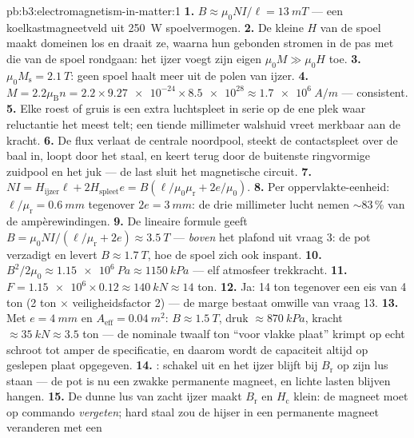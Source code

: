 \begin{solution}{pb:b3:electromagnetism-in-matter:1}
\textbf{1.} $B \approx \mu_0NI/\ell = \qty{13}{mT}$ --- een
koelkastmagneetveld uit \qty{250}{W} spoelvermogen.
\textbf{2.} De kleine $H$ van de spoel maakt domeinen los en draait ze, waarna hun
gebonden stromen in de pas met die van de spoel rondgaan: het ijzer
voegt zijn eigen $\mu_0M \gg \mu_0H$ toe.
\textbf{3.} $\mu_0M_{\text{s}} = \qty{2.1}{T}$: geen spoel haalt
meer uit de polen van ijzer.
\textbf{4.} $M = 2.2\mu_{\text{B}}n = 2.2\times\num{9.27e-24}
\times\num{8.5e28} \approx \qty{1.7e6}{A/m}$ --- consistent.
\textbf{5.} Elke roest of gruis is een extra luchtspleet in serie op de ene
plek waar reluctantie het meest telt; een tiende millimeter walshuid
vreet merkbaar aan de kracht.
\textbf{6.} De flux verlaat de centrale noordpool, steekt de
contactspleet over de baal in, loopt door het staal, en keert terug
door de buitenste ringvormige zuidpool en het juk --- de last
sluit het magnetische circuit.
\textbf{7.} $NI = H_{\text{ijzer}}\ell + 2H_{\text{spleet}}e =
B(\ell/\mu_0\mu_{\text{r}} + 2e/\mu_0)$.
\textbf{8.} Per oppervlakte-eenheid: $\ell/\mu_{\text{r}} = \qty{0.6}{mm}$
tegenover $2e = \qty{3}{mm}$: de drie millimeter lucht nemen
$\sim83\,\%$ van de ampèrewindingen.
\textbf{9.} De lineaire formule geeft $B = \mu_0NI/(\ell/
\mu_{\text{r}} + 2e) \approx \qty{3.5}{T}$ --- \emph{boven} het
plafond uit vraag 3: de pot verzadigt en levert $B \approx
\qty{1.7}{T}$, hoe de spoel zich ook inspant.
\textbf{10.} $B^2/2\mu_0 \approx \qty{1.15e6}{Pa} \approx
\qty{1150}{kPa}$ --- elf atmosfeer trekkracht.
\textbf{11.} $F = \num{1.15e6}\times0.12 \approx \qty{140}{kN}
\approx 14$ ton.
\textbf{12.} Ja: 14 ton tegenover een eis van 4 ton
(2 ton $\times$ veiligheidsfactor 2) --- de marge bestaat
omwille van vraag 13.
\textbf{13.} Met $e = \qty{4}{mm}$ en $A_{\text{eff}} =
\qty{0.04}{m^2}$: $B \approx \qty{1.5}{T}$, druk
$\approx\qty{870}{kPa}$, kracht $\approx\qty{35}{kN} \approx 3.5$
ton --- de nominale twaalf ton ``voor vlakke plaat'' krimpt op echt schroot tot
amper de specificatie, en daarom wordt de capaciteit altijd
op geslepen plaat opgegeven.
\textbf{14.} : schakel uit en het ijzer blijft bij
$B_{\text{r}}$ op zijn lus staan --- de pot is nu een zwakke permanente
magneet, en lichte lasten blijven hangen.
\textbf{15.} De dunne lus van zacht ijzer maakt $B_{\text{r}}$ en
$H_{\text{c}}$ klein: de magneet moet op commando \emph{vergeten};
hard staal zou de hijser in een permanente magneet veranderen met een

\end{solution}
